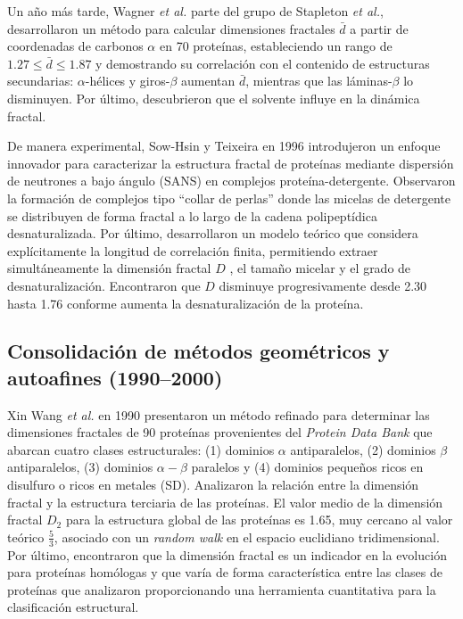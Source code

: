 Un año m\'{a}s tarde, Wagner \textit{et al.} \cite{Wagner1985} parte  del grupo de Stapleton \textit{et al.}, desarrollaron un m\'{e}todo para calcular dimensiones fractales $\bar{d}$ a partir de coordenadas de carbonos $\alpha$ en 70 prote\'{i}nas, estableciendo un rango de $1.27 \leq \bar{d} \leq 1.87$ y demostrando su correlaci\'{o}n con el contenido de estructuras secundarias: $\alpha$-h\'{e}lices y giros-$\beta$ aumentan $\bar{d}$, mientras que las l\'{a}minas-$\beta$ lo disminuyen. Por \'{u}ltimo, descubrieron que el solvente influye en la din\'{a}mica fractal.

De manera experimental, Sow-Hsin y Teixeira \cite{Chen1986} en 1996 introdujeron un enfoque innovador para caracterizar la estructura fractal de prote\'{i}nas mediante dispersi\'{o}n de neutrones a bajo \'{a}ngulo (SANS) en complejos prote\'{i}na-detergente. Observaron la formaci\'{o}n de complejos tipo ``collar de perlas'' donde las micelas de detergente se distribuyen de forma fractal a lo largo de la cadena polipept\'{i}dica desnaturalizada. Por \'{u}ltimo, desarrollaron un modelo te\'{o}rico que considera expl\'{i}citamente la longitud de correlaci\'{o}n finita, permitiendo extraer simult\'{a}neamente la dimensi\'{o}n fractal $D$ , el tamaño micelar y el grado de desnaturalizaci\'{o}n. Encontraron que $D$ disminuye progresivamente desde 2.30 hasta 1.76 conforme aumenta la desnaturalizaci\'{o}n de la prote\'{i}na.

\subsection{Consolidaci\'{o}n de m\'{e}todos geom\'{e}tricos y autoafines (1990--2000)}


Xin Wang \textit{et al.} \cite{Wang1990} en 1990 presentaron un m\'{e}todo refinado para determinar las dimensiones fractales de 90 prote\'{i}nas provenientes del \textit{Protein Data Bank} que abarcan cuatro clases estructurales: (1) dominios $\alpha$ antiparalelos, (2) dominios $\beta$ antiparalelos, (3) dominios $\alpha-\beta$ paralelos y (4) dominios pequeños ricos en disulfuro o ricos en metales (SD). Analizaron la relaci\'{o}n entre la dimensi\'{o}n fractal y la estructura terciaria de las prote\'{i}nas. El valor medio de la dimensi\'{o}n fractal $D_{2}$ para la estructura global de las prote\'{i}nas es 1.65, muy cercano al valor te\'{o}rico $\frac{5}{3}$, asociado con un \textit{random walk} en el espacio euclidiano tridimensional. Por \'{u}ltimo, encontraron que la dimensi\'{o}n fractal es un indicador en la evoluci\'{o}n para prote\'{i}nas hom\'{o}logas y que var\'{i}a de forma caracter\'{i}stica entre las clases de prote\'{i}nas que analizaron proporcionando una herramienta cuantitativa para la clasificaci\'{o}n estructural.


